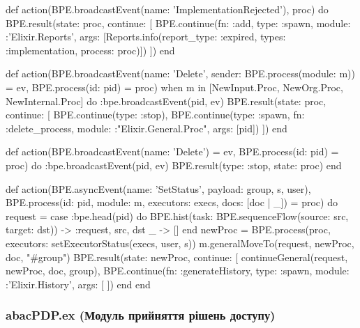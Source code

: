 \documentclass{article}
\let\originalfootnotesize\footnotesize
\let\oldverbatim\verbatim
\let\oldendverbatim\endverbatim
\renewenvironment{verbatim}{\originalfootnotesize\oldverbatim}{\oldendverbatim}
\begin{document}
\begin{verbatim}
  def action(BPE.broadcastEvent(name: 'ImplementationRejected'), proc) do
    BPE.result(state: proc, continue: [
      BPE.continue(fn: :add, type: :spawn, module: :'Elixir.Reports',
        args: [Reports.info(report_type: :expired, types: :implementation,
        process: proc)])
    ])
  end

  def action(BPE.broadcastEvent(name: 'Delete',
    sender: BPE.process(module: m)) = ev, BPE.process(id: pid) = proc)
    when m in [NewInput.Proc, NewOrg.Proc, NewInternal.Proc] do
    :bpe.broadcastEvent(pid, ev)
    BPE.result(state: proc, continue: [
      BPE.continue(type: :stop),
      BPE.continue(type: :spawn, fn: :delete_process,
        module: :"Elixir.General.Proc", args: [pid])
    ])
  end

  def action(BPE.broadcastEvent(name: 'Delete') = ev,
    BPE.process(id: pid) = proc) do
    :bpe.broadcastEvent(pid, ev)
    BPE.result(type: :stop, state: proc)
  end

  def action(BPE.asyncEvent(name: 'SetStatus', payload: {group, s, user}),
    BPE.process(id: pid, module: m, executors: execs, docs: [doc | _]) = proc) do
    request = case :bpe.head(pid) do
      BPE.hist(task: BPE.sequenceFlow(source: src, target: dst)) ->
        {:request, src, dst}
      _ -> []
    end
    newProc = BPE.process(proc, executors: setExecutorStatus(execs, user, s))
    m.generalMoveTo(request, newProc, doc, "#{group}")
    BPE.result(state: newProc, continue: [
      continueGeneral(request, newProc, doc, group),
      BPE.continue(fn: :generateHistory, type: :spawn, module: :'Elixir.History',
        args: [%HistExt{action: s, procId: pid, user: user}])
    ])
  end
end
\end{verbatim}
\endgroup

\subsubsection{abacPDP.ex (Модуль прийняття рішень доступу)}
\end{document}
